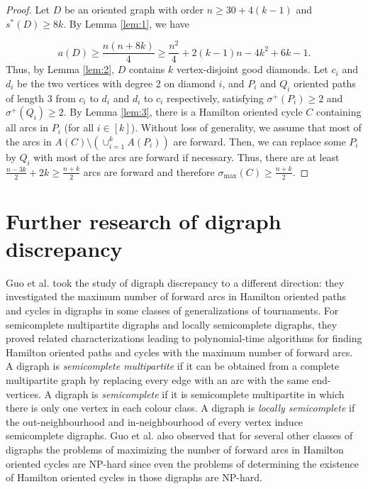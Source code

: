 \documentclass[11pt]{article}
\newcommand{\GGr}[1]{{#1}}
\newcommand{\QGr}[1]{{#1}}
\newcommand{\2}{\vspace{0.2cm}}
\begin{document}
	\begin{proof}
	    Let $D$ be an oriented graph with order $n\ge 30+4(k-1)$ and $s^*(D)\geq 8k$. By Lemma \ref{lem:1}, we have
		
		\[a(D)\geq \frac{n(n+8k)}{4}\geq  \frac{n^2}{4} + 2(k-1)n - 4k^2 +6k-1.\]
Thus, by Lemma \ref{lem:2}, $D$ contains $k$ vertex-disjoint good diamonds. Let $c_i$ and $d_i$ be the two vertices with degree $2$ on diamond $i$, and $P_i$ and $Q_i$ oriented  paths of length 3 from $c_i$ to $d_i$ and $d_i$ to $c_i$ respectively, satisfying $\sigma^+(P_i)\ge 2$ and $\sigma^+(Q_i)\ge 2$. By Lemma \ref{lem:3}, there is a Hamilton oriented cycle $C$ containing all arcs in $P_i$ (for all $i\in [k]$). Without loss of generality, we assume that most of the arcs in $A(C)\setminus (\cup_{i=1}^k A(P_i))$ \QGr{are forward}. Then, we can replace some $P_i$ by $Q_i$ with most of the arcs \QGr{are forward} if necessary. Thus, there are at least $\frac{n-3k}{2}+2k\geq \frac{n+k}{2}$ arcs \QGr{are forward} and therefore $\sigma_{\max}(C)\geq \frac{n+k}{2}$.
 	\end{proof}	
	
\section{Further research of digraph discrepancy}\label{sec:further}

\GGr{Guo et al. \cite{Guo+}  took the  study of digraph discrepancy to a different direction: they investigated the maximum number of forward arcs in Hamilton oriented paths and cycles in digraphs in some classes of generalizations of tournaments. For semicomplete multipartite digraphs and locally semicomplete digraphs, they proved related characterizations leading to polynomial-time algorithms for finding Hamilton oriented paths and cycles with the maximum number of forward arcs. A digraph is {\em semicomplete multipartite} if it can be obtained from a complete multipartite graph by replacing every edge with an arc with the same end-vertices. A digraph is {\em semicomplete} if it is semicomplete multipartite in which there is only one vertex in each colour class. 
A digraph is {\em locally semicomplete}  if the out-neighbourhood and in-neighbourhood of every vertex induce semicomplete digraphs. 
Guo et al. \cite{Guo+}  also observed that for several other classes of digraphs the problems of maximizing the number of forward arcs in Hamilton oriented cycles
are NP-hard since even the problems of determining the existence of Hamilton oriented  cycles in those digraphs are NP-hard. }
\end{document}
